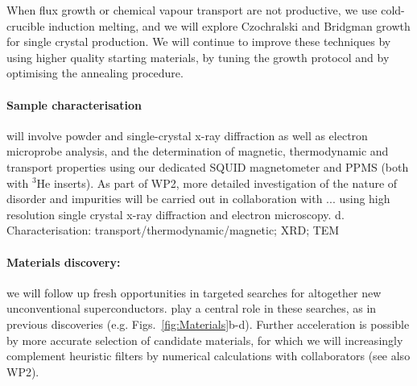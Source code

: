 When flux growth or chemical vapour transport are not productive, we use cold-crucible %
induction melting, and we will
explore Czochralski and Bridgman growth for single crystal production. We will continue to improve these techniques by using higher quality starting materials, by tuning the growth protocol and by optimising the annealing procedure.  


\paragraph {Sample characterisation} will involve powder and
single-crystal x-ray diffraction as well as electron microprobe analysis,
and the determination of magnetic, thermodynamic and transport
properties using our dedicated
SQUID magnetometer and PPMS (both with $^3$He inserts).  
As part of WP2, more detailed investigation of the nature of disorder and impurities will be carried out in collaboration with ... using high resolution single crystal x-ray diffraction and electron microscopy.
d. Characterisation: transport/thermodynamic/magnetic; XRD; TEM


\paragraph{Materials discovery:}
we will follow up fresh opportunities in targeted searches for altogether new unconventional superconductors. %
 play a central role in these searches, as in previous discoveries (e.g. Figs.~\ref{fig:Materials}b-d). %
Further acceleration is possible  by more accurate selection of candidate materials, for which we will increasingly complement heuristic filters by numerical calculations with collaborators (see also WP2).  






